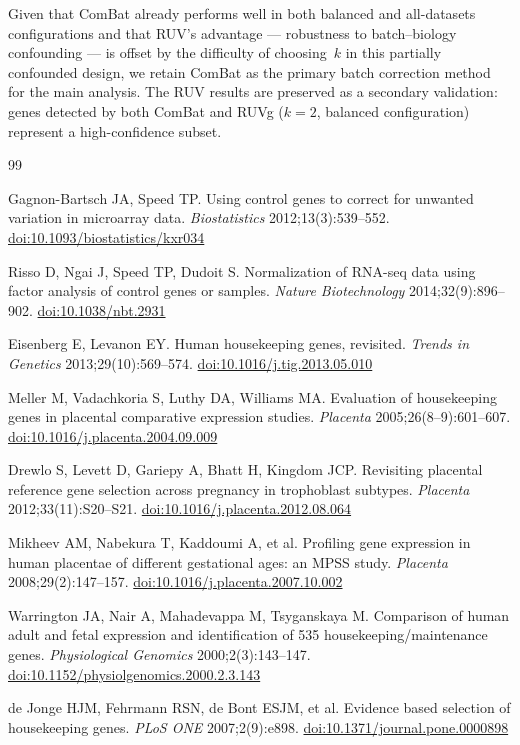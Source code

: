 \documentclass[11pt,a4paper]{article}
\newcommand{\doi}[1]{\href{https://doi.org/#1}{doi:#1}}
\begin{document}
Given that ComBat already performs well in both balanced and
all-datasets configurations and that RUV's advantage ---
robustness to batch--biology confounding --- is offset by the
difficulty of choosing~$k$ in this partially confounded design,
we retain ComBat as the primary batch correction method for the
main analysis.  The RUV results are preserved as a secondary
validation: genes detected by both ComBat and RUVg ($k = 2$,
balanced configuration) represent a high-confidence subset.


\begin{thebibliography}{99}

Gagnon-Bartsch JA, Speed TP.
Using control genes to correct for unwanted variation in
microarray data.
\textit{Biostatistics} 2012;13(3):539--552.
\doi{10.1093/biostatistics/kxr034}

Risso D, Ngai J, Speed TP, Dudoit S.
Normalization of RNA-seq data using factor analysis of control
genes or samples.
\textit{Nature Biotechnology} 2014;32(9):896--902.
\doi{10.1038/nbt.2931}

Eisenberg E, Levanon EY.
Human housekeeping genes, revisited.
\textit{Trends in Genetics} 2013;29(10):569--574.
\doi{10.1016/j.tig.2013.05.010}

Meller M, Vadachkoria S, Luthy DA, Williams MA.
Evaluation of housekeeping genes in placental comparative
expression studies.
\textit{Placenta} 2005;26(8--9):601--607.
\doi{10.1016/j.placenta.2004.09.009}

Drewlo S, Levett D, Gariepy A, Bhatt H, Kingdom JCP.
Revisiting placental reference gene selection across pregnancy
in trophoblast subtypes.
\textit{Placenta} 2012;33(11):S20--S21.
\doi{10.1016/j.placenta.2012.08.064}

Mikheev AM, Nabekura T, Kaddoumi A, et al.
Profiling gene expression in human placentae of different
gestational ages: an MPSS study.
\textit{Placenta} 2008;29(2):147--157.
\doi{10.1016/j.placenta.2007.10.002}

Warrington JA, Nair A, Mahadevappa M, Tsyganskaya M.
Comparison of human adult and fetal expression and identification
of 535 housekeeping/maintenance genes.
\textit{Physiological Genomics} 2000;2(3):143--147.
\doi{10.1152/physiolgenomics.2000.2.3.143}

de Jonge HJM, Fehrmann RSN, de Bont ESJM, et al.
Evidence based selection of housekeeping genes.
\textit{PLoS ONE} 2007;2(9):e898.
\doi{10.1371/journal.pone.0000898}


\end{thebibliography}
\end{document}
